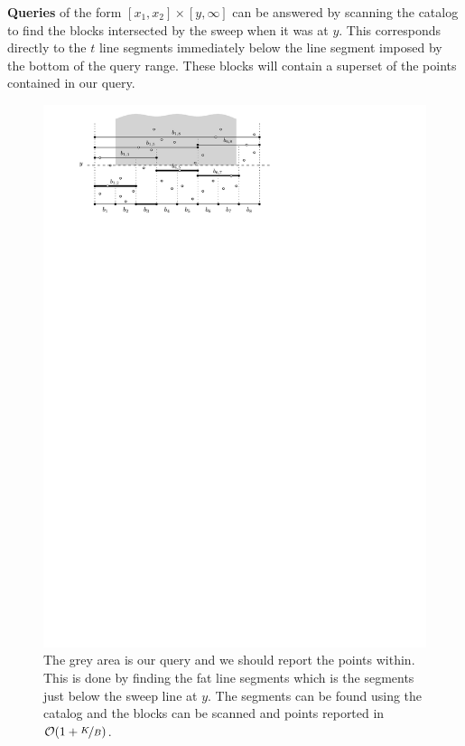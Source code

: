 \documentclass[twoside,11pt,openright]{report}
\begin{document}
\textbf{Queries} of the form $[x_1,x_2] \times [y,\infty]$ can be answered by scanning the catalog to find the blocks intersected by the sweep when it was at $y$. This corresponds directly to the $t$ line segments immediately below the line segment imposed by the bottom of the query range. These blocks will contain a superset of the points contained in our query.

\begin{figure}[h]
	\centering
	\includegraphics[scale=1]{../figures/sweep-line-with-query}
	\caption{The grey area is our query and we should report the points within. This is done by finding the fat line segments which is the segments just below the sweep line at $y$. The segments can be found using the catalog and the blocks can be scanned and points reported in $\mathcal{O}(1+\nicefrac{K}{B})$.}
	\label{fig:sweep-line-query}
\end{figure}
\end{document}

